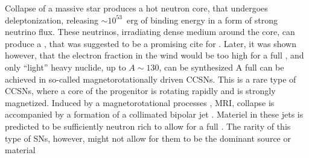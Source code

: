 Collapse of a massive star produces a hot neutron core, that undergoes deleptonization, releasing 
$\sim10^{53}$~erg of binding energy in a form of strong neutrino flux. These neutrinos, irradiating 
dense medium around the core, can produce a \nwind{} \citep{Qian:1996xt}, that was suggested to be 
a promising cite for \rproc{} \citep{Woosley:2002,Wanajo:2006mq}. Later, it was shown however, that 
the electron fraction in the wind would be too high for a full \rproc{}, and only ``light'' heavy 
nuclide, up to $A\sim130$, can be synthesized 
\citep{Qian:1996xt,Thompson:2001ys,Fischer:2010,Roberts:2010,MartinezPinedo:2012rb,Wanajo:2013} 
%
%
A full \rproc{} can be achieved in so-called magnetorotationally driven \acp{CCSN}. 
This is a rare type of \acp{CCSN}, where a core of the progenitor is rotating rapidly 
and is strongly magnetized. Induced by a magnetorotational processes \eg, \ac{MRI}, 
collapse is accompanied by a formation of a collimated bipolar jet 
\citep{Wheeler:2000,Akiyama:2003,Burrows:2007yx,Mosta:2014jaa,Mosta:2015,Siegel:2019mlp}.
Materiel in these jets is predicted to be sufficiently neutron rich to allow for a full 
\rproc{} \nuc{} \citep{Winteler:2012,Nishimura:2015nca}. The rarity of this type of \acp{SN}, 
however, might not allow for them to be the dominant source or \rproc{} material 
\citep{Nishimura:2015nca} 




